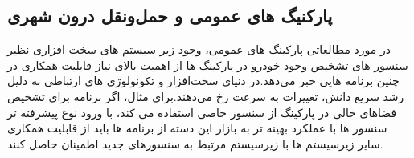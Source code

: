 \subsection{پارکنیگ های عمومی و حمل‌و‌نقل درون شهری}
در مورد مطالعاتی پارکینگ های عمومی، وجود زیر سیستم های سخت افزاری نظیر سنسور های تشخیص وجود خودرو در پارکینگ ها از اهمیت بالای نیاز قابلیت همکاری در چنین برنامه هایی خبر می‌دهد.در دنیای سخت‌افزار و تکونولوژی های ارتباطی به دلیل رشد سریع دانش، تغییرات به سرعت رخ می‌دهند.برای مثال، اگر برنامه برای تشخیص فضا‌های خالی در پارکینگ از سنسور خاصی استفاده می کند، با ورود نوع پیشرفته تر سنسور ها با عملکرد بهینه تر به بازار این دسته از برنامه ها باید از قابلیت همکاری سایر زیر‌سیستم ها با زیرسیستم مرتبط به سنسور‌های جدید اطمینان حاصل کنند.











